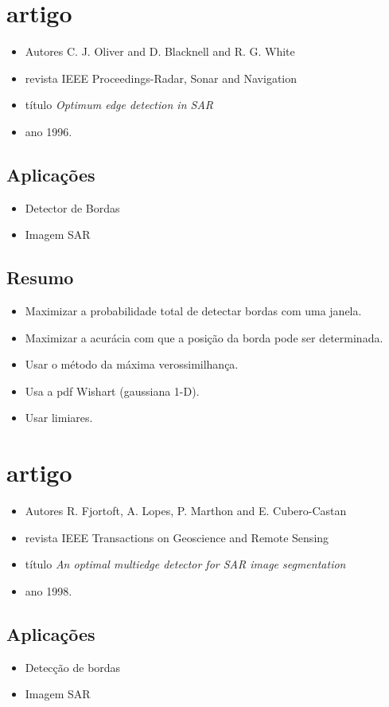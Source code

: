 \documentclass{article}
\begin{document}
\section{artigo \cite{obw}}
\begin{itemize}
\item Autores C. J. Oliver and D. Blacknell and R. G. White
\item revista IEEE Proceedings-Radar, Sonar and Navigation
\item título \textit{Optimum edge detection in SAR}
\item ano 1996.
\end{itemize}
\subsection{Aplicações}
\begin{itemize}
\item Detector de Bordas
\item Imagem SAR
\end{itemize}
\subsection{Resumo}
\begin{itemize}
\item Maximizar a probabilidade total de detectar bordas com uma janela.
\item Maximizar a acurácia com que a posição da borda pode ser determinada.
\item Usar o método da máxima verossimilhança.
\item Usa a pdf Wishart (gaussiana 1-D).
\item Usar limiares. 
\end{itemize}

\section{artigo \cite{flmc}}
\begin{itemize}
\item Autores R. Fjortoft, A. Lopes, P. Marthon and E. Cubero-Castan 
\item revista IEEE Transactions on Geoscience and Remote Sensing
\item título \textit{An optimal multiedge detector for {SAR} image segmentation}
\item ano 1998.
\end{itemize}
\subsection{Aplicações}
\begin{itemize}
\item Detecção de bordas
\item Imagem SAR
\end{itemize}
\end{document}
